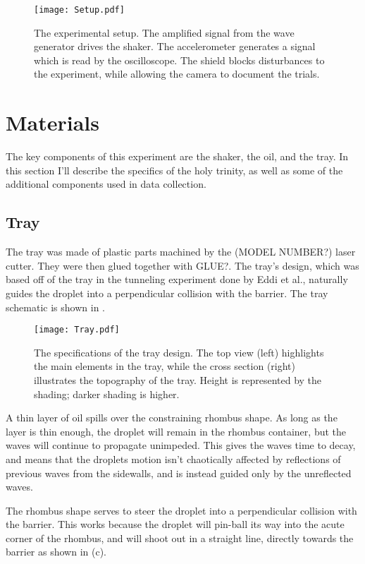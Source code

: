    
    
\begin{figure}[h!]
	\centering
	\texttt{[image: Setup.pdf]}
	\caption{The experimental setup. The amplified signal from the wave generator drives the shaker. The accelerometer generates a signal which is read by the oscilloscope. The shield blocks disturbances to the experiment, while allowing the camera to document the trials.}
	\label{setup}
\end{figure}

\section{Materials}
The key components of this experiment are the shaker, the oil, and the tray. In this section I'll describe the specifics of the holy trinity, as well as some of the additional components used in data collection. 

\subsection{Tray}
The tray was made of plastic parts machined by the (MODEL NUMBER?) laser cutter. They were then glued together with GLUE?. The tray's design, which was based off of the tray in the tunneling experiment done by Eddi et al., naturally guides the droplet into a perpendicular collision with the barrier. The tray schematic is shown in . 

\begin{figure}[h!]
	\centering
	\texttt{[image: Tray.pdf]}
	\caption{The specifications of the tray design. The top view (left) highlights the main elements in the tray, while the cross section (right) illustrates the topography of the tray. Height is represented by the shading; darker shading is higher.}
	\label{tray}
\end{figure}

A thin layer of oil spills over the constraining rhombus shape. As long as the layer is thin enough, the droplet will remain in the rhombus container, but the waves will continue to propagate unimpeded. This gives the waves time to decay, and means that the droplets motion isn't chaotically affected by reflections of previous waves from the sidewalls, and is instead guided only by the unreflected waves. 

The rhombus shape serves to steer the droplet into a perpendicular collision with the barrier. This works because the droplet will pin-ball its way into the acute corner of the rhombus, and will shoot out in a straight line, directly towards the barrier as shown in (c).

